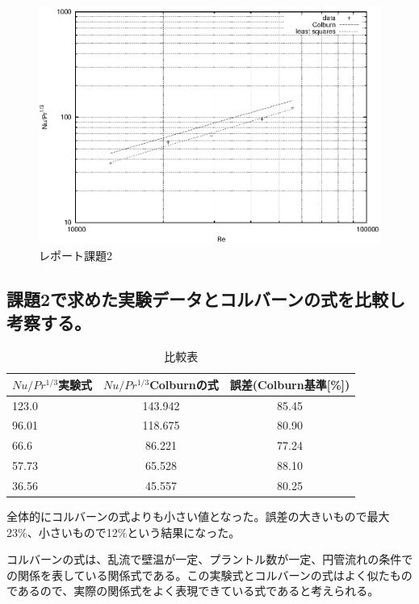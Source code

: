 \documentclass[a4j,twoside,openright,11pt]{jarticle}
\begin{document}
\begin{figure}[htbp]
\begin{center}
\includegraphics[width=14cm]{./Colburn/data.eps}
\end{center}
\caption{レポート課題2}
\end{figure}

\subsection{課題2で求めた実験データとコルバーンの式を比較し考察する。}
\begin{table}[htb]
\begin{center}
  \caption{比較表}
  \begin{tabular}{|l|c|c|} \hline
$Nu/Pr^{1/3}$実験式&$Nu/Pr^{1/3}$Colburnの式&誤差(Colburn基準[\%])\\
\hline
123.0&143.942&85.45\\
96.01&118.675&80.90\\
66.6 & 86.221&77.24\\
57.73& 65.528&88.10\\
36.56& 45.557&80.25\\\hline
  \end{tabular}
\end{center}
\end{table}
全体的にコルバーンの式よりも小さい値となった。誤差の大きいもので最大23\%、小さいもので12\%という結果になった。

コルバーンの式は、乱流で壁温が一定、プラントル数が一定、円管流れの条件での関係を表している関係式である。この実験式とコルバーンの式はよく似たものであるので、実際の関係式をよく表現できている式であると考えられる。
\end{document}
